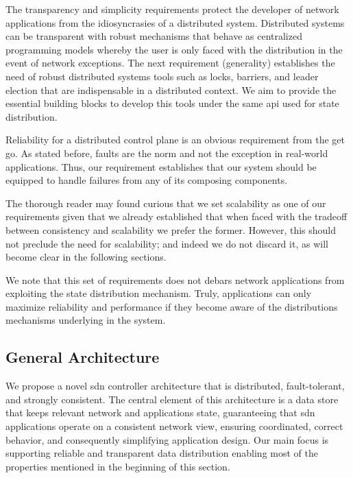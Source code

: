 The transparency and simplicity requirements protect the developer of network applications from the 
idiosyncrasies of a distributed system. 
Distributed systems can be transparent with robust mechanisms that behave
as centralized programming models whereby the user is only faced with the distribution 
in the event of network exceptions. 
The next requirement (generality) establishes the need of robust distributed systems tools such as locks,
barriers, and leader election that are indispensable in a distributed context.  
We aim to provide the essential building blocks to develop this tools under the same \gls{api} used for state distribution.

Reliability for a distributed control plane is an obvious requirement from the get go. 
As stated before, faults are the norm and not the exception in real-world applications.  
Thus, our requirement establishes that our system should be equipped to handle failures from any of its composing components. 

The thorough reader may found curious that we set scalability as one of our requirements given that we already established that when faced with the tradeoff between consistency and scalability we prefer the former. 
However, this should not preclude the need for scalability; and indeed we do not discard it, as will become clear in the following sections. 

We note that this set of requirements does not debars network applications from exploiting the state distribution mechanism. 
Truly, applications can only maximize reliability and performance if they become aware of the distributions mechanisms underlying in the system. 


\subsection{General Architecture}
We propose a novel \gls{sdn} controller architecture that is distributed, fault-tolerant, and strongly consistent.
The central element of this architecture is a data store that keeps relevant network and applications state, guaranteeing that \gls{sdn} applications operate on a consistent network view, ensuring coordinated, correct behavior, and consequently simplifying application design.
Our main focus is supporting reliable and transparent  data distribution enabling  most of the properties mentioned in the beginning of this section. 

